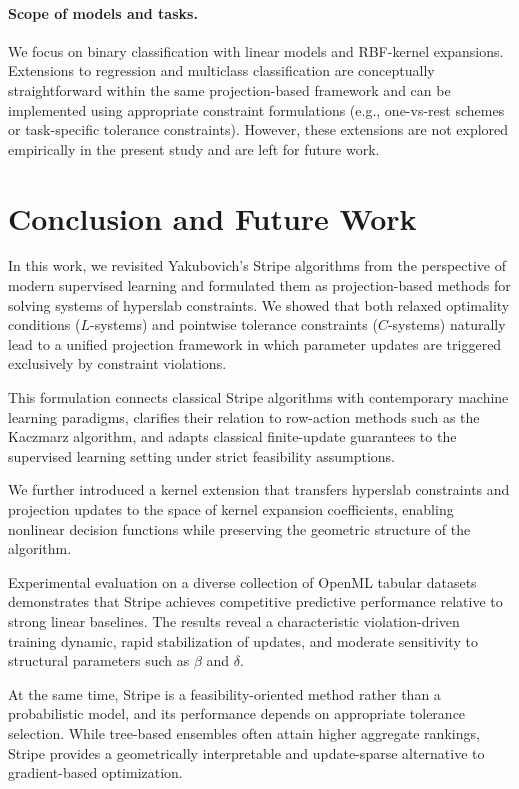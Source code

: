 \documentclass[a4paper,fleqn]{cas-sc}
\begin{document}
\paragraph{Scope of models and tasks.}
We focus on binary classification with linear models and RBF-kernel expansions. 
Extensions to regression and multiclass classification are conceptually straightforward within the same projection-based framework and can be implemented using appropriate constraint formulations (e.g., one-vs-rest schemes or task-specific tolerance constraints). 
However, these extensions are not explored empirically in the present study and are left for future work.

\section{Conclusion and Future Work}

In this work, we revisited Yakubovich’s Stripe algorithms from the perspective of modern supervised learning and formulated them as projection-based methods for solving systems of hyperslab constraints. We showed that both relaxed optimality conditions ($L$-systems) and pointwise tolerance constraints ($C$-systems) naturally lead to a unified projection framework in which parameter updates are triggered exclusively by constraint violations.

This formulation connects classical Stripe algorithms with contemporary machine learning paradigms, clarifies their relation to row-action methods such as the Kaczmarz algorithm, and adapts classical finite-update guarantees to the supervised learning setting under strict feasibility assumptions.

We further introduced a kernel extension that transfers hyperslab constraints and projection updates to the space of kernel expansion coefficients, enabling nonlinear decision functions while preserving the geometric structure of the algorithm.

Experimental evaluation on a diverse collection of OpenML tabular datasets demonstrates that Stripe achieves competitive predictive performance relative to strong linear baselines. The results reveal a characteristic violation-driven training dynamic, rapid stabilization of updates, and moderate sensitivity to structural parameters such as $\beta$ and $\delta$.

At the same time, Stripe is a feasibility-oriented method rather than a probabilistic model, and its performance depends on appropriate tolerance selection. While tree-based ensembles often attain higher aggregate rankings, Stripe provides a geometrically interpretable and update-sparse alternative to gradient-based optimization.
\end{document}

